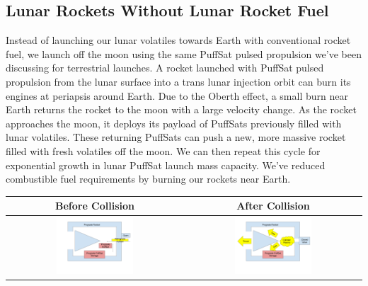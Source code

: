\documentclass{article}
\begin{document}
{\subsection{Lunar Rockets Without Lunar Rocket Fuel} \label{sec:lunar_rockets_no_fuel}
Instead of launching our lunar volatiles towards Earth with conventional rocket fuel, we launch off the moon using the same PuffSat pulsed propulsion we've been discussing for terrestrial launches.   A rocket launched with PuffSat pulsed propulsion from the lunar surface into a trans lunar injection orbit can burn its engines at periapsis around Earth.  Due to the Oberth effect, a small burn near Earth returns the rocket to the moon with a large velocity change.  As the rocket approaches the moon, it deploys its payload of PuffSats previously filled with lunar volatiles.  These returning PuffSats can push a new, more massive rocket filled with fresh volatiles off the moon.   We can then repeat this  cycle for exponential growth in lunar PuffSat launch mass capacity.   We've reduced combustible fuel requirements by burning our rockets near Earth.


\begin{table}[htpb!]
    \centering
    \begin{tabular}{|c|c|}
        \hline
        Before Collision & After Collision \\\hline
        \includegraphics[width=0.45\textwidth]{images/Pulsed Propulsion Chamber Before Impact.png} &
        \includegraphics[width=0.45\textwidth]{images/_Pulsed Propulsion Chamber After Impact.png} \\ \hline
         

\end{tabular}
\end{table}}
\end{document}
